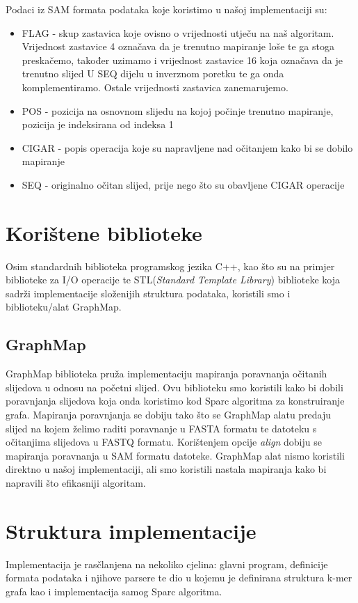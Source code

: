 \documentclass[times, utf8, seminar, numeric]{fer}
\begin{document}
Podaci iz SAM formata podataka koje koristimo u našoj implementaciji su:
\renewcommand{\labelitemi}{$\bullet$}
\begin{itemize}
	\item FLAG - skup zastavica koje ovisno o vrijednosti utječu na naš algoritam. Vrijednost zastavice 4 označava da je trenutno mapiranje loše te ga stoga preskačemo, također uzimamo i vrijednost zastavice 16 koja označava da je trenutno slijed U SEQ dijelu u inverznom poretku te ga onda komplementiramo. Ostale vrijednosti zastavica zanemarujemo.  
	\item POS - pozicija na osnovnom slijedu na kojoj počinje trenutno mapiranje, pozicija je indeksirana od indeksa 1
	\item CIGAR - popis operacija koje su napravljene nad očitanjem kako bi se dobilo mapiranje
	\item SEQ - originalno očitan slijed, prije nego što su obavljene CIGAR operacije
\end{itemize}

\section{Korištene biblioteke}
Osim standardnih biblioteka programskog jezika C++, kao što su na primjer biblioteke za I/O operacije te STL(\emph{Standard Template Library}) biblioteke koja sadrži implementacije složenijih struktura podataka, koristili smo i biblioteku/alat GraphMap.
\subsection{GraphMap}
GraphMap biblioteka pruža implementaciju mapiranja poravnanja očitanih slijedova u odnosu na početni slijed. Ovu biblioteku smo koristili kako bi dobili poravnjanja slijedova koja onda koristimo kod Sparc algoritma za konstruiranje grafa. Mapiranja poravnjanja se dobiju tako što se GraphMap alatu predaju slijed na kojem želimo raditi poravnanje u FASTA formatu te datoteku s očitanjima slijedova u FASTQ formatu. Korištenjem opcije \emph{align} dobiju se mapiranja poravnanja u SAM formatu datoteke.
GraphMap alat nismo koristili direktno u našoj implementaciji, ali smo koristili nastala mapiranja kako bi napravili što efikasniji algoritam.

\section{Struktura implementacije}
Implementacija je rasčlanjena na nekoliko cjelina: glavni program, definicije formata podataka i njihove parsere te dio u kojemu je definirana struktura k-mer grafa kao i implementacija samog Sparc algoritma.
\end{document}
